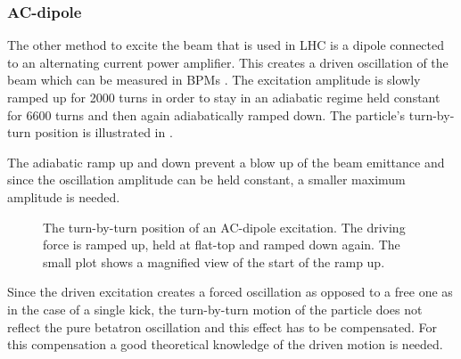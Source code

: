\subsubsection{AC-dipole}

The other method to excite the beam that is used in LHC is a dipole connected to an alternating current
power amplifier.
This creates a driven oscillation of the beam \cite{Peggs1998} which can be measured in BPMs \cite{Miyamoto2008, Miyamoto2010}.
The excitation amplitude is slowly ramped up for 2000 turns in order to stay in an
adiabatic regime \cite{Tomas2005ac} held constant for 6600 turns and then again adiabatically ramped down.
The particle's turn-by-turn position is illustrated in .

The adiabatic ramp up and down prevent a blow up of the beam emittance and since the oscillation amplitude
can be held constant, a smaller maximum amplitude is needed. 
%
\begin{figure}[ht]
    \centering
    \caption{
        The turn-by-turn position of an AC-dipole excitation. The driving force is ramped up,
        held at flat-top and ramped down again.
        The small plot shows a magnified view of the start of the ramp up.
    }
    \label{fig_ac_plot}
\end{figure}
%
Since the driven excitation creates a forced oscillation as opposed to a free one as in the case of
a single kick, the turn-by-turn motion of the particle does not reflect the pure betatron oscillation
and this effect has to be compensated. For this compensation a good theoretical knowledge of the driven
motion is needed.

